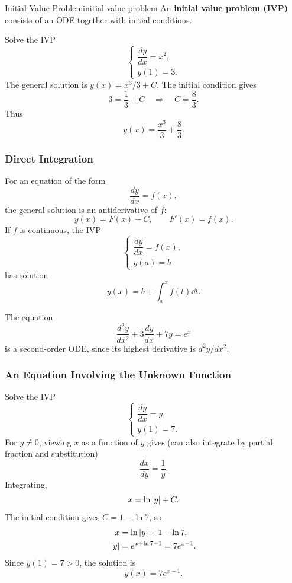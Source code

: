 \begin{definition}{Initial Value Problem}{initial-value-problem}
  An \textbf{initial value problem (IVP)} consists of an ODE together with initial conditions.
\end{definition}

\begin{example}
  Solve the IVP
  \[
    \begin{cases}
      \dfrac{dy}{dx}=x^2, \\
      y(1)=3.
    \end{cases}
  \]
  The general solution is $y(x)=x^3/3+C$. The initial condition gives
  \[
    3=\frac{1}{3}+C \quad\Longrightarrow\quad C=\frac{8}{3}.
  \]
  Thus
  \[
    y(x)=\frac{x^3}{3}+\frac{8}{3}.
  \]
\end{example}

\subsubsection{Direct Integration}

For an equation of the form
\[
  \frac{dy}{dx}=f(x),
\]
the general solution is an antiderivative of $f$:
\[
  y(x)=F(x)+C, \qquad F'(x)=f(x).
\]
If $f$ is continuous, the IVP
\[
  \begin{cases}
    \dfrac{dy}{dx}=f(x), \\
    y(a)=b
  \end{cases}
\]
has solution
\[
  y(x)=b+\int_a^x f(t)\dd{t}.
\]

\begin{example}
  The equation
  \[
    \frac{d^2y}{dx^2}+3\frac{dy}{dx}+7y=e^x
  \]
  is a second-order ODE, since its highest derivative is $d^2y/dx^2$.
\end{example}

\subsubsection{An Equation Involving the Unknown Function}

\begin{example}
  Solve the IVP
  \[
    \begin{cases}
      \dfrac{dy}{dx}=y, \\
      y(1)=7.
    \end{cases}
  \]
  For $y\ne0$, viewing $x$ as a function of $y$ gives (can also integrate by partial fraction and substitution)
  \[
    \frac{dx}{dy}=\frac{1}{y}.
  \]
  Integrating,
  \[
    x=\ln\left\lvert y \right\rvert+C.
  \]
  The initial condition gives $C=1-\ln 7$, so
  \begin{align*}
    x       & = \ln\left\lvert y \right\rvert+1-\ln 7,     \\
    \left\lvert y \right\rvert & = e^{x+\ln 7-1}=7e^{x-1}.
  \end{align*}
  Since $y(1)=7>0$, the solution is
  \[
    y(x)=7e^{x-1}.
  \]
\end{example}


